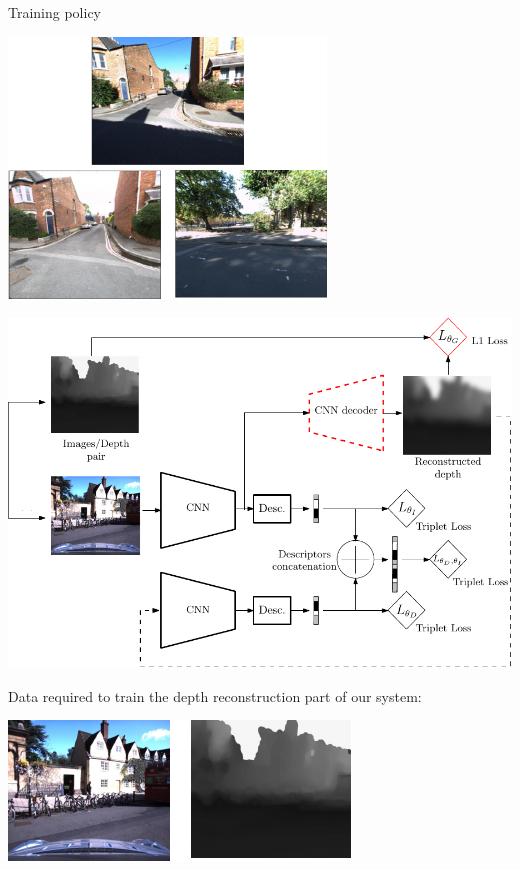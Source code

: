 \begin{frame}{Training policy}
{\begin{minipage}{0.3\linewidth}
		\includegraphics[width=\linewidth]{vect/method/fig3/triplet}	
	\end{minipage}		
	}
	{
	\begin{minipage}{0.6\linewidth}
		\centering
		\includegraphics[width=\linewidth]{vect/method/fig3/6d}
	\end{minipage}\hfill
	\begin{minipage}{0.3\linewidth}
		\raggedright
		Data required to train the depth reconstruction part of our system:
		\vspace{0.5cm}
		
		\includegraphics[width=\linewidth]{vect/method/fig3/pair}	
	\end{minipage}			
	}
\end{frame}


